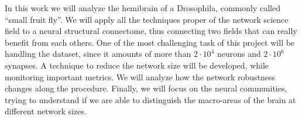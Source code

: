 In this work we will analyze the hemibrain of a Drosophila, commonly called “small fruit fly”.
We will apply all the techniques proper of the network science field to a neural structural connectome,
thus connecting two fields that can really 
benefit from each others. One of the most challenging task of this project will be handling
the dataset, since it amounts of more than $2\cdot10^{4}$ neurons and $2\cdot10^6$ synapses.
A technique to reduce the network size will be developed, while monitoring important metrics. 
We will analyze how the network robustness changes along the procedure.
Finally, we will focus on the neural communities, trying to understand 
if we are able to distinguish the macro-areas of the brain at different network sizes.
